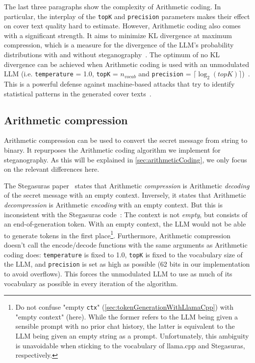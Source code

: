 The last three paragraphs show the complexity of Arithmetic coding. In particular, the interplay of the \lstinline|topK| and \lstinline|precision| parameters makes their effect on cover text quality hard to estimate. However, Arithmetic coding also comes with a significant strength. It aims to minimize \gls{KL} divergence at maximum compression, which is a measure for the divergence of the \gls{LLM}'s probability distributions with and without steganography~\cite{zieglerNeuralLinguisticSteganography2019}. The optimum of no \gls{KL} divergence can be achieved when Arithmetic coding is used with an unmodulated \gls{LLM} (i.e. \lstinline|temperature| = 1.0, \lstinline|topK| = $n_{vocab}$ and \lstinline|precision| = $ \lceil \log_2(topK) \rceil $)~\cite{zieglerNeuralLinguisticSteganography2019}. This is a powerful defense against machine-based attacks that try to identify statistical patterns in the generated cover texts~\cite{zieglerNeuralLinguisticSteganography2019}.

\subsection{Arithmetic compression}
\label{sec:arithmeticCompression}
Arithmetic compression can be used to convert the secret message from string to binary. It repurposes the Arithmetic coding algorithm we implement for steganography. As this will be explained in \cref{sec:arithmeticCoding}, we only focus on the relevant differences here.

The Stegasuras paper~\cite{zieglerNeuralLinguisticSteganography2019} states that Arithmetic \textit{compression} is Arithmetic \textit{decoding} of the secret message with an empty context. Inversely, it states that Arithmetic \textit{decompression} is Arithmetic \textit{encoding} with an empty context. But this is inconsistent with the Stegasuras code~\cite{zieglerHarvardnlpNeuralSteganography2025}: The context is not \textit{empty}, but consists of an end-of-generation token. With an empty context, the \gls{LLM} would not be able to generate tokens in the first place\footnote{Do not confuse "empty \lstinline|ctx|" (\cref{sec:tokenGenerationWithLlamaCpp}) with "empty context" (here). While the former refers to the \gls{LLM} being given a sensible prompt with no prior chat history, the latter is equivalent to the \gls{LLM} being given an empty string as a prompt. Unfortunately, this ambiguity is unavoidable when sticking to the vocabulary of llama.cpp and Stegasuras, respectively.}. Furthermore, Arithmetic compression doesn't call the encode/decode functions with the same arguments as Arithmetic coding does: \lstinline|temperature| is fixed to 1.0, \lstinline|topK| is fixed to the vocabulary size of the \gls{LLM}, and \lstinline|precision| is set as high as possible (62 bits in our implementation to avoid overflows). This forces the unmodulated \gls{LLM} to use as much of its vocabulary as possible in every iteration of the algorithm.

